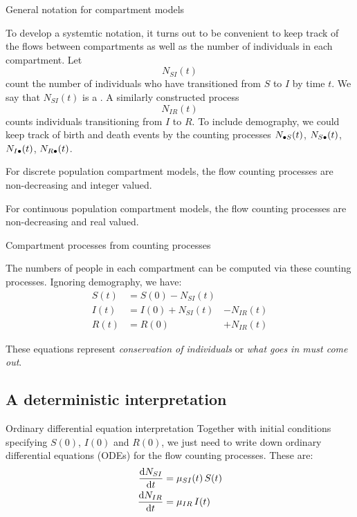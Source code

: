 \begin{frame}[allowframebreaks=0.8]{General notation for compartment models}
  \bi
\item To develop a systemtic notation, it turns out to be convenient to keep track of the flows between compartments as well as the number of individuals in each compartment. Let
  $$N_{SI}(t)$$
  count the number of individuals who have transitioned from $S$ to $I$ by time $t$. We say that $N_{SI}(t)$ is a . A similarly constructed process
  $$N_{IR}(t)$$
  counts individuals transitioning from $I$ to $R$. To include demography, we could keep track of birth and death events by the counting processes $N_{{\small{\bullet}} S}(t)$, $N_{S{\small{\bullet}}}(t)$, $N_{I{\small{\bullet}}}(t)$, $N_{R{\small{\bullet}}}(t)$.
\item For discrete population compartment models, the flow counting processes are non-decreasing and integer valued.
\item For continuous population compartment models, the flow counting processes are non-decreasing and real valued.
  \ei
\end{frame}

\begin{frame}{Compartment processes from counting processes}

  \bi
\item The numbers of people in each compartment can be computed via these counting processes. Ignoring demography, we have:
  \begin{equation*}
    \begin{aligned}
      S(t) &= S(0) - N_{SI}(t) &\\
      I(t) &= I(0) + N_{SI}(t) &- N_{IR}(t) \\
      R(t) &= R(0) &+ N_{IR}(t)
    \end{aligned}
  \end{equation*}

\item These equations represent \emph{conservation of individuals} or \emph{what goes in must come out}. 

  \ei

\end{frame}


\subsection{A deterministic interpretation}

\begin{frame}{Ordinary differential equation interpretation}
  Together with initial conditions specifying $S(0)$, $I(0)$ and $R(0)$, we just need to write down ordinary differential equations (ODEs) for the flow counting processes.
  These are:
  \begin{equation*}
    \begin{aligned}
      \deriv{N_{SI}}{t} &= \mu_{SI}(t)\,S(t)\\
      \deriv{N_{IR}}{t} &= \mu_{IR}\,I(t)
    \end{aligned}
  \end{equation*}
\end{frame}

